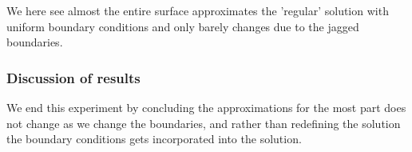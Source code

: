 We here see almost the entire surface approximates the 'regular' solution with uniform boundary conditions and only barely changes due to the jagged boundaries.

\subsubsection{Discussion of results}
We end this experiment by concluding the approximations for the most part does not change as we change the boundaries, and rather than redefining the solution the boundary conditions gets incorporated into the solution.